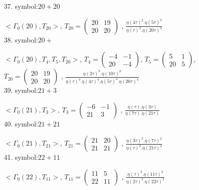 37. symbol:$ 20+20 $

$ < \Gamma_0 ( 20 ), T_{20} >  $,
$
T_{20} = 
\left(
\begin{array}{cc}
20 & 19 \\
20 & 20
\end{array}
\right)
$
, {$ \frac{\eta(4\tau)^2 . \eta(5\tau)^2}{\eta(\tau)^2 . \eta(20\tau)^2} $}
\\

38. symbol:$ 20+ $

$ < \Gamma_0 ( 20 ), T_4, T_5, T_{20} >  $,
$
T_4 = 
\left(
\begin{array}{cc}
-4 & -1 \\
20 & -4
\end{array}
\right)
$,
$
T_5 = 
\left(
\begin{array}{cc}
5 & 1 \\
20 & 5
\end{array}
\right)
$,
$
T_{20} = 
\left(
\begin{array}{cc}
20 & 19 \\
20 & 20
\end{array}
\right)
$
, {$ \frac{\eta(2\tau)^8 . \eta(10\tau)^8}{\eta(\tau)^4 .\eta(4\tau)^4 .\eta(5\tau)^4. \eta(20\tau)^4} $}
\\

39. symbol:$ 21+3 $

$ < \Gamma_0 ( 21 ), T_3 >  $,
$
T_3 = 
\left(
\begin{array}{cc}
-6 & -1 \\
21 & 3
\end{array}
\right)
$
, {$ \frac{\eta(\tau) . \eta(3\tau)}{\eta(7\tau) . \eta(21\tau)} $}
\\

40. symbol:$ 21+21 $

$ < \Gamma_0 ( 21 ), T_{21} >  $,
$
T_{21} = 
\left(
\begin{array}{cc}
21 & 20 \\
21 & 21
\end{array}
\right)
$
, {$ \frac{\eta(3\tau)^2 . \eta(7\tau)^2}{\eta(\tau)^2 . \eta(21\tau)^2} $}
\\

41. symbol:$ 22+11 $

$ < \Gamma_0 ( 22 ), T_{11} >  $,
$
T_{11} = 
\left(
\begin{array}{cc}
11 & 5 \\
22 & 11
\end{array}
\right)
$
, {$ \frac{\eta(\tau)^2 . \eta(11\tau)^2}{\eta(2\tau)^2 . \eta(22\tau)^2} $}
\\

